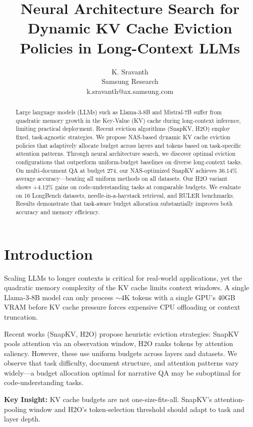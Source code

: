 \documentclass[11pt,a4paper]{article}
\title{Neural Architecture Search for Dynamic KV Cache Eviction Policies in Long-Context LLMs}
\author{K. Sravanth \\ Samsung Research \\ k.sravanth@ax.samsung.com}
\date{}
\begin{document}
\maketitle

\begin{abstract}
Large language models (LLMs) such as Llama-3-8B and Mistral-7B suffer from quadratic memory growth in the Key-Value (KV) cache during long-context inference, limiting practical deployment. Recent eviction algorithms (SnapKV, H2O) employ fixed, task-agnostic strategies. We propose NAS-based dynamic KV cache eviction policies that adaptively allocate budget across layers and tokens based on task-specific attention patterns. Through neural architecture search, we discover optimal eviction configurations that outperform uniform-budget baselines on diverse long-context tasks. On multi-document QA at budget 274, our NAS-optimized SnapKV achieves 36.14\% average accuracy—beating all uniform methods on all datasets. Our H2O variant shows +4.12\% gains on code-understanding tasks at comparable budgets. We evaluate on 16 LongBench datasets, needle-in-a-haystack retrieval, and RULER benchmarks. Results demonstrate that task-aware budget allocation substantially improves both accuracy and memory efficiency.
\end{abstract}

\section{Introduction}

Scaling LLMs to longer contexts is critical for real-world applications, yet the quadratic memory complexity of the KV cache limits context windows. A single Llama-3-8B model can only process $\sim$4K tokens with a single GPU's 40GB VRAM before KV cache pressure forces expensive CPU offloading or context truncation.

Recent works (SnapKV, H2O) propose heuristic eviction strategies: SnapKV pools attention via an observation window, H2O ranks tokens by attention saliency. However, these use uniform budgets across layers and datasets. We observe that task difficulty, document structure, and attention patterns vary widely—a budget allocation optimal for narrative QA may be suboptimal for code-understanding tasks.

\textbf{Key Insight:} KV cache budgets are not one-size-fits-all. SnapKV's attention-pooling window and H2O's token-selection threshold should adapt to task and layer depth.
\end{document}
